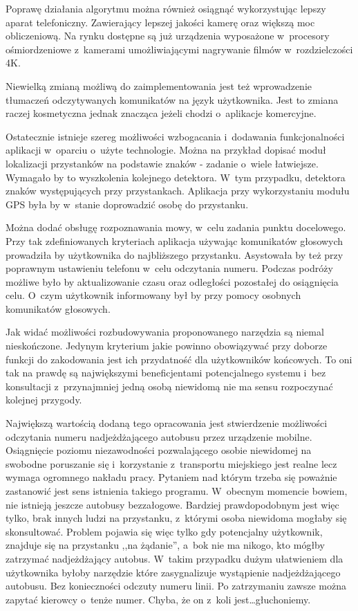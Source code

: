 Poprawę działania algorytmu można również osiągnąć wykorzystując 
lepszy aparat telefoniczny. Zawierający lepszej jakości kamerę oraz
większą moc obliczeniową. Na rynku dostępne są już urządzenia
wyposażone w~procesory ośmiordzeniowe z~kamerami umożliwiającymi 
nagrywanie filmów w~rozdzielczości 4K.

Niewielką zmianą możliwą do zaimplementowania jest też wprowadzenie
tłumaczeń odczytywanych komunikatów na język użytkownika. 
Jest to zmiana raczej kosmetyczna jednak znacząca jeżeli chodzi
o~aplikacje komercyjne.

Ostatecznie istnieje szereg możliwości wzbogacania i~dodawania
funkcjonalności aplikacji w~oparciu o~użyte technologie.
Można na przykład dopisać moduł lokalizacji przystanków
na podstawie znaków - zadanie o~wiele łatwiejsze. Wymagało by to
wyszkolenia kolejnego detektora. W~tym przypadku, detektora znaków
występujących przy przystankach. Aplikacja przy wykorzystaniu 
modułu GPS była by w~stanie doprowadzić osobę do przystanku.

Można dodać obsługę rozpoznawania mowy, w~celu zadania punktu docelowego.
Przy tak zdefiniowanych kryteriach aplikacja używając komunikatów
głosowych prowadziła by użytkownika do najbliższego przystanku. 
Asystowała by też przy poprawnym ustawieniu telefonu w~celu odczytania
numeru. Podczas podróży możliwe było by aktualizowanie czasu oraz
odległości pozostałej do osiągnięcia celu. O~czym użytkownik informowany
był by przy pomocy osobnych komunikatów głosowych.

Jak widać możliwości rozbudowywania proponowanego narzędzia są niemal
nieskończone. Jedynym kryterium jakie powinno obowiązywać przy
doborze funkcji do zakodowania jest ich przydatność dla użytkowników 
końcowych. To oni tak na prawdę są największymi beneficjentami 
potencjalnego systemu i~bez konsultacji z~przynajmniej jedną osobą
niewidomą nie ma sensu rozpoczynać kolejnej przygody.

Największą
wartością dodaną tego opracowania jest stwierdzenie możliwości odczytania
numeru nadjeżdżającego autobusu przez urządzenie mobilne.
Osiągnięcie poziomu niezawodności pozwalającego osobie niewidomej 
na swobodne poruszanie się i~korzystanie z~transportu miejskiego jest
realne lecz wymaga ogromnego nakładu pracy. Pytaniem nad którym 
trzeba się poważnie zastanowić jest sens istnienia takiego programu.
W~obecnym momencie bowiem, nie istnieją jeszcze autobusy bezzałogowe. 
Bardziej prawdopodobnym jest więc tylko, 
brak innych ludzi na przystanku, z~którymi osoba niewidoma mogłaby się
skonsultować. Problem pojawia się więc tylko gdy potencjalny użytkownik,
znajduje się na przystanku ,,na żądanie'', a~bok
nie ma nikogo, kto mógłby zatrzymać nadjeżdżający autobus. W~takim
przypadku dużym ułatwieniem dla użytkownika byłoby narzędzie
które zasygnalizuje wystąpienie nadjeżdżającego autobusu.
Bez konieczności odczuty numeru linii. Po zatrzymaniu
zawsze można zapytać kierowcy o~tenże numer. Chyba, że on 
z~koli jest\ldots głuchoniemy.
